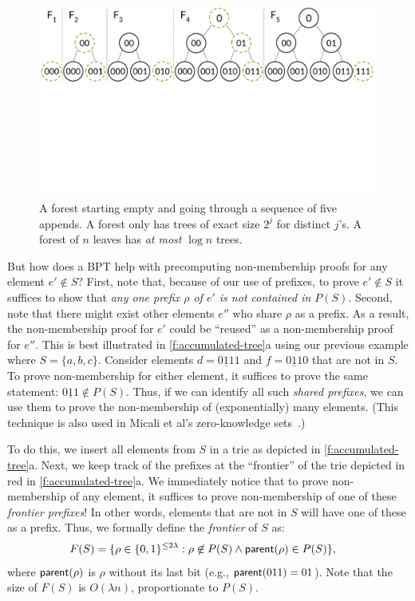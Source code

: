 \begin{figure}[t]
    \centering
    \includegraphics[width=1\columnwidth]{figures/forest.pdf}
    \vspace{-3.4cm}
    \caption{
        A forest starting empty and going through a sequence of five appends.
        A forest only has trees of exact size $2^j$ for distinct $j$'s.
        A forest of $n$ leaves has \textit{at most} $\log{n}$ trees. 
    }
    \label{f:forest}
    \vspace{-1.55em}
\end{figure}

But how does a BPT help with precomputing non-membership proofs for any element $e'\notin S$?
First, note that, because of our use of prefixes, to prove $e'\notin S$ it suffices to show that \textit{any one prefix $\rho$ of $e'$ is not contained in $P(S)$}.
Second, note that there might exist other elements $e''$ who share $\rho$ as a prefix.
As a result, the non-membership proof for $e'$ could be ``reused'' as a non-membership proof for $e''$.
This is best illustrated in \cref{f:accumulated-tree}a using our previous example where $S =\{a,b,c\}$.
Consider elements $d= \underline{011}1$ and $f = \underline{011}0$ that are not in $S$.
To prove non-membership for either element, it suffices to prove the same statement: $\underline{011}\notin P(S)$.
Thus, if we can identify all such \textit{shared prefixes}, we can use them to prove the non-membership of (exponentially) many elements.
(This technique is also used in Micali et al's zero-knowledge sets~\cite{zks}.)

To do this, we insert all elements from $S$ in a trie as depicted in \cref{f:accumulated-tree}a.
Next, we keep track of the prefixes at the ``frontier'' of the trie depicted in red in \cref{f:accumulated-tree}a.
We immediately notice that to prove non-membership of any element, it suffices to prove non-membership of one of these \textit{frontier prefixes}!
In other words, elements that are not in $S$ will have one of these as a prefix.
Thus, we formally define the \textit{frontier} of $S$ as:
\begin{align*}
    F(S) &= \{\rho \in \{0,1\}^{\le 2\lambda}: {\rho\not \in P(S)} \wedge {\ensuremath{\mathsf{parent}}(\rho) \in P(S)}\}\text{,}
\end{align*}
where $\mathsf{parent}(\rho)$ is $\rho$ without its last bit (e.g., $\mathsf{parent}(011) = 01$).
Note that the size of $F(S)$ is $O(\lambda n)$, proportionate to $P(S)$.

